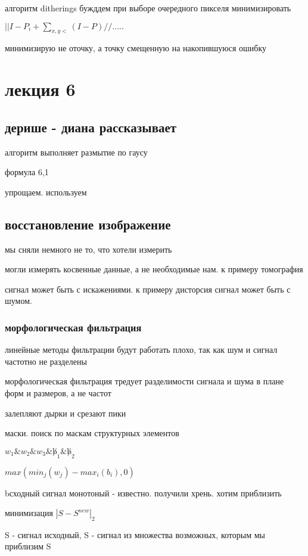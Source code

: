 \documentclass[]{report}
\begin{document}
алгоритм ditherings
бужддем при выборе очередного пикселя минимизировать

$||I-P_i + \sum_{x,y<}(I-P)//.....$

минимизирую не оточку, а точку смещенную на накопившуюся ошибку

\chapter{лекция 6}
\section{дерише - диана рассказывает}

алгоритм выполняет размытие по гаусу

формула 6,1

упрощаем.
используем 

\section{восстановление изображение}

мы сняли немного не то, что хотели измерить

могли измерять косвенные данные, а не необходимые нам. к примеру томография

сигнал может быть с искажениями. к примеру дисторсия
сигнал может быть с шумом. 

\subsection{морфологическая фильтрация}

линейные методы фильтрации будут работать плохо, так как шум и сигнал частотно не разделены

морфологическая фильтрация тредует разделимости сигнала и шума в плане форм и размеров, а не частот

залепляют дырки и срезают пики

маски. поиск по маскам структурных элементов

$w_1 \& w_2 \& w_3 \& \not b_1 \& \not b_2$

$max(min_j(w_j)-max_i(b_i), 0)$

bсходный сигнал монотоный - известно. получили хрень. хотим приблизить

минимизация $|S-S^{new}|_2$

S - сигнал исходный, S - сигнал из множества возможных, которым мы приблизим S
\end{document}
